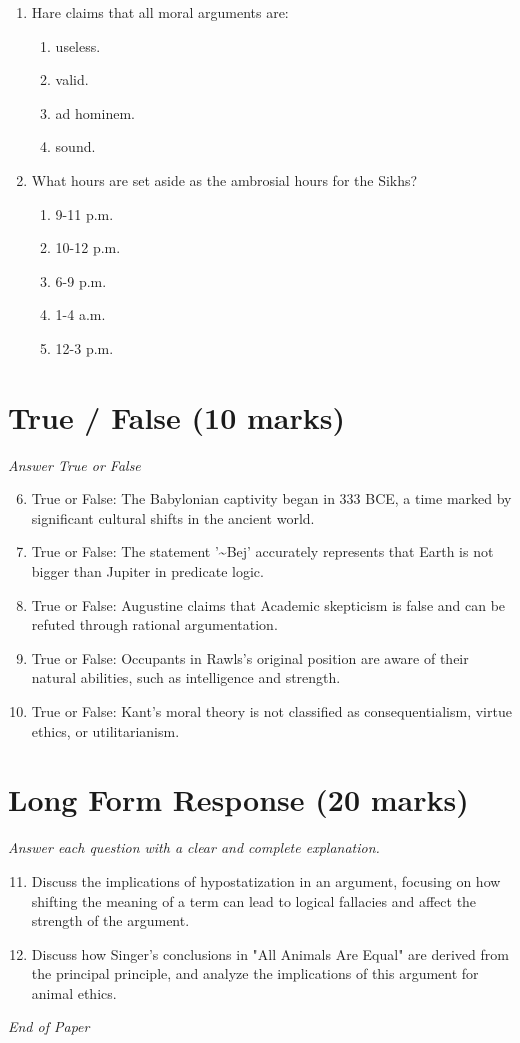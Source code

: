 \documentclass[12pt]{article}
\begin{document}
\begin{enumerate}[label=\arabic*.]
\item Hare claims that all moral arguments are:
\begin{enumerate}[label=(\alph*)]
    \item useless.
    \item valid.
    \item ad hominem.
    \item sound.
\end{enumerate}
\item What hours are set aside as the ambrosial hours for the Sikhs?
\begin{enumerate}[label=(\alph*)]
    \item 9-11 p.m.
    \item 10-12 p.m.
    \item 6-9 p.m.
    \item 1-4 a.m.
    \item 12-3 p.m.
\end{enumerate}
\end{enumerate}

\section*{True / False (10 marks)}
\textit{Answer True or False}
\begin{enumerate}[label=\arabic*.]
\setcounter{enumi}{5}
\item True or False: The Babylonian captivity began in 333 BCE, a time marked by significant cultural shifts in the ancient world.
\item True or False: The statement '\textasciitilde{}Bej' accurately represents that Earth is not bigger than Jupiter in predicate logic.
\item True or False: Augustine claims that Academic skepticism is false and can be refuted through rational argumentation.
\item True or False: Occupants in Rawls's original position are aware of their natural abilities, such as intelligence and strength.
\item True or False: Kant's moral theory is not classified as consequentialism, virtue ethics, or utilitarianism.
\end{enumerate}

\section*{Long Form Response (20 marks)}
\textit{Answer each question with a clear and complete explanation.}
\begin{enumerate}[label=\arabic*.]
\setcounter{enumi}{10}
\item Discuss the implications of hypostatization in an argument, focusing on how shifting the
meaning of a term can lead to logical fallacies and affect the strength of the argument.
\item Discuss how Singer's conclusions in "All Animals Are Equal" are derived from the principal
principle, and analyze the implications of this argument for animal ethics.
\end{enumerate}

\vfill
\noindent\textit{End of Paper}
\end{document}
